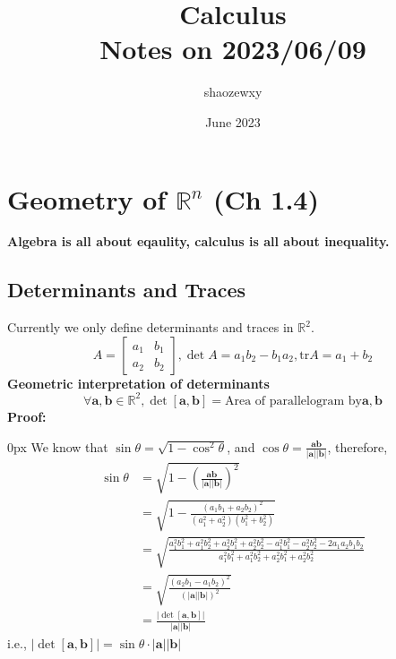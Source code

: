 \documentclass{article}
\title{Calculus\\
\large{Notes on 2023/06/09}}
\author{shaozewxy }
\date{June 2023}
\begin{document}
\maketitle

\section{Geometry of $\mathbb{R}^n$ (Ch 1.4)}
\textbf{Algebra is all about eqaulity, calculus is all about inequality.}
\subsection{Determinants and Traces}
Currently we only define determinants and traces in $\mathbb{R}^2$.
\begin{equation*}
    A = \begin{bmatrix}
        a_1& b_1\\
        a_2& b_2
    \end{bmatrix}, \det A = a_1b_2 - b_1a_2, \mathrm{tr} A = a_1 + b_2
\end{equation*}
\textbf{Geometric interpretation of determinants}
\begin{equation*}
    \forall \mathbf{a, b} \in \mathbb{R}^2, \det [\mathbf{a, b}] = \textrm{Area of parallelogram by} \mathbf{a, b}
\end{equation*}
\textbf{Proof:}
\begin{addmargin}[10px]{0px}
    We know that $\sin \theta = \sqrt{1 - \cos^2 \theta}$, and $\cos \theta = \frac{\mathbf{ab}}{\mathbf{|a||b|}}$, therefore,
    \begin{equation*}
        \begin{split}
            \sin \theta &= \sqrt{1 - \left(\frac{\mathbf{ab}}{\mathbf{|a||b|}}\right)^2}\\
            &= \sqrt{1 - \frac{(a_1b_1 + a_2b_2)^2}{(a_1^2+a_2^2)(b_1^2+b_2^2)}}\\
            &= \sqrt{\frac{a_1^2b_1^2+a_1^2b_2^2+a_2^2b_1^2+a_2^2b_2^2 - a_1^2b_1^2 - a_2^2b_2^2 - 2a_1a_2b_1b_2}
            {a_1^2b_1^2+a_1^2b_2^2+a_2^2b_1^2+a_2^2b_2^2}}\\
            &= \sqrt{\frac{(a_2b_1-a_1b_2)^2}{(\mathbf{|a||b|})^2}}\\
            &= \frac{|\det [\mathbf{a, b}]|}{\mathbf{|a||b|}}
        \end{split}
    \end{equation*}
    i.e., $|\det[\mathbf{a, b}]| = \sin \theta \cdot \mathbf{|a||b|}$
\end{addmargin}
\end{document}
